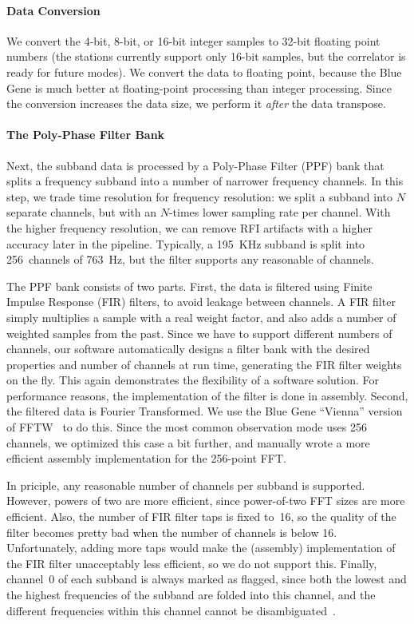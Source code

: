 \paragraph{Data Conversion}
We convert the 4-bit, 8-bit, or 16-bit integer samples to 32-bit
floating point numbers (the stations currently support only 16-bit samples,
but the correlator is ready for future modes).
We convert the data to floating point, because the Blue Gene is much better at
floating-point processing than integer processing.
Since the conversion increases the data size, we perform it \emph{after\/} the
data transpose.


\paragraph{The Poly-Phase Filter Bank }
Next, the subband data is processed by a Poly-Phase Filter (PPF) bank that
splits a frequency subband into a number of narrower frequency channels.
In this step, we trade time resolution for frequency resolution: we split a
subband into $N$ separate channels, but with an $N$-times lower sampling rate
per channel.
With the higher frequency resolution, we can remove RFI artifacts with a
higher accuracy later in the pipeline.
Typically, a 195~KHz subband is split into 256~channels of 763~Hz, but the
filter supports any reasonable of channels.

The PPF bank consists of two parts.
First, the data is filtered using Finite Impulse Response (FIR) filters,
to avoid leakage between channels.
A FIR filter simply multiplies a sample with a real weight factor, and
also adds a number of weighted samples from the past.
Since we have to support different numbers of channels, our software
automatically designs a filter bank with the desired properties and number
of channels at run time, generating the FIR filter weights on the fly.
This again demonstrates the flexibility of a software solution.
For performance reasons, the implementation of the filter is done in assembly.
Second, the filtered data is Fourier Transformed.
We use the Blue Gene ``Vienna'' version of FFTW~\cite{Lorenz:05} to do this.
Since the most common observation mode uses 256 channels, we optimized this
case a bit further, and manually wrote a more efficient assembly
implementation for the 256-point FFT.

In priciple, any reasonable number of channels per subband is supported.
However, powers of two are more efficient, since power-of-two FFT sizes
are more efficient.
Also, the number of FIR filter taps is fixed to~16, so the quality of the
filter becomes pretty bad when the number of channels is below 16.
Unfortunately, adding more taps would make the (assembly) implementation
of the FIR filter unacceptably less efficient, so we do not support this.
Finally, channel~0 of each subband is always marked as flagged, since both
the lowest and the highest frequencies of the subband are folded into this
channel, and the different frequencies within this channel cannot be
disambiguated~\cite{Romein:08}.


